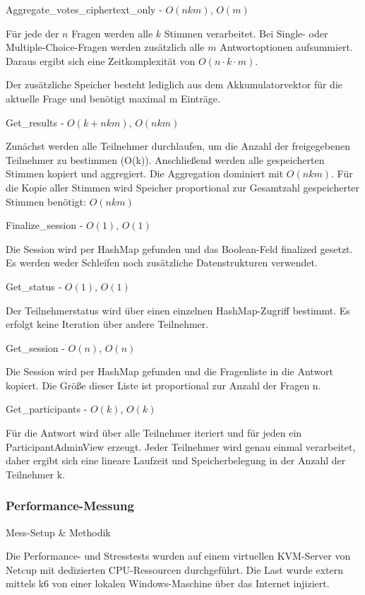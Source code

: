 Aggregate\_votes\_ciphertext\_only - $O(nkm)$, $O(m)$

Für jede der $n$ Fragen werden alle $k$ Stimmen verarbeitet. Bei Single- oder Multiple-Choice-Fragen werden zusätzlich alle $m$ Antwortoptionen aufsummiert. Daraus ergibt sich eine Zeitkomplexität von $O(n \cdot k \cdot m)$.

Der zusätzliche Speicher besteht lediglich aus dem Akkumulatorvektor für die aktuelle Frage und benötigt maximal m Einträge.

Get\_results - $O(k+nkm)$, $O(nkm)$

Zunächst werden alle Teilnehmer durchlaufen, um die Anzahl der freigegebenen Teilnehmer zu bestimmen (O(k)). Anschließend werden alle gespeicherten Stimmen kopiert und aggregiert. Die Aggregation dominiert mit $O(nkm)$. Für die Kopie aller Stimmen wird Speicher proportional zur Gesamtzahl gespeicherter Stimmen benötigt: $O(nkm)$

Finalize\_session - $O(1)$, $O(1)$

Die Session wird per HashMap gefunden und das Boolean-Feld finalized gesetzt. Es werden weder Schleifen noch zusätzliche Datenstrukturen verwendet.

Get\_status - $O(1)$, $O(1)$

Der Teilnehmerstatus wird über einen einzelnen HashMap-Zugriff bestimmt. Es erfolgt keine Iteration über andere Teilnehmer.

Get\_session - $O(n)$, $O(n)$

Die Session wird per HashMap gefunden und die Fragenliste in die Antwort kopiert. Die Größe dieser Liste ist proportional zur Anzahl der Fragen n.

Get\_participants - $O(k)$, $O(k)$

Für die Antwort wird über alle Teilnehmer iteriert und für jeden ein ParticipantAdminView erzeugt. Jeder Teilnehmer wird genau einmal verarbeitet, daher ergibt sich eine lineare Laufzeit und Speicherbelegung in der Anzahl der Teilnehmer k.

\subsubsection{Performance-Messung}

Mess-Setup \& Methodik

Die Performance- und Stresstests wurden auf einem virtuellen KVM-Server von Netcup mit dedizierten CPU-Ressourcen durchgeführt. Die Last wurde extern mittels k6 von einer lokalen Windows-Maschine über das Internet injiziert.

